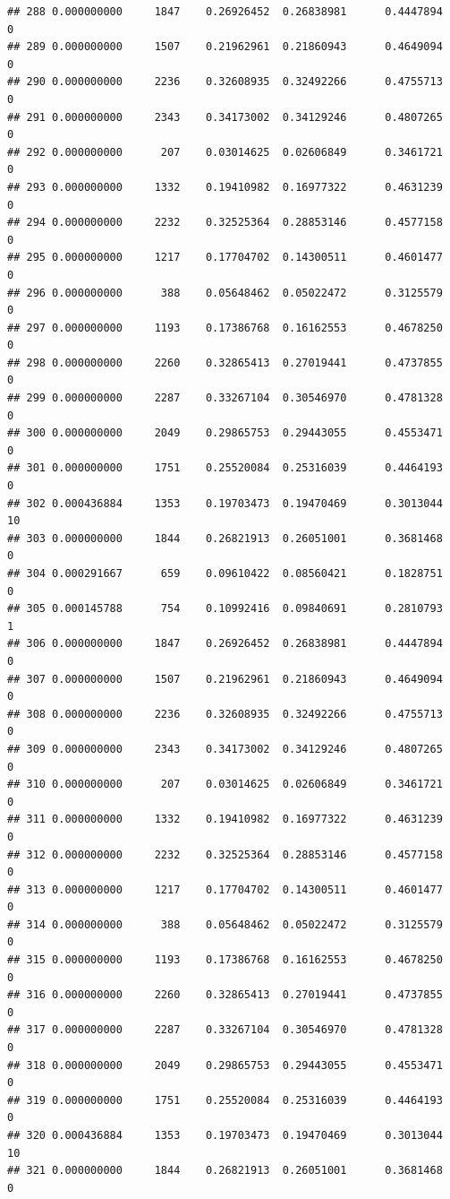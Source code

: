 \documentclass[
]{article}
\begin{document}
\begin{verbatim}
## 288 0.000000000     1847    0.26926452  0.26838981      0.4447894       0
## 289 0.000000000     1507    0.21962961  0.21860943      0.4649094       0
## 290 0.000000000     2236    0.32608935  0.32492266      0.4755713       0
## 291 0.000000000     2343    0.34173002  0.34129246      0.4807265       0
## 292 0.000000000      207    0.03014625  0.02606849      0.3461721       0
## 293 0.000000000     1332    0.19410982  0.16977322      0.4631239       0
## 294 0.000000000     2232    0.32525364  0.28853146      0.4577158       0
## 295 0.000000000     1217    0.17704702  0.14300511      0.4601477       0
## 296 0.000000000      388    0.05648462  0.05022472      0.3125579       0
## 297 0.000000000     1193    0.17386768  0.16162553      0.4678250       0
## 298 0.000000000     2260    0.32865413  0.27019441      0.4737855       0
## 299 0.000000000     2287    0.33267104  0.30546970      0.4781328       0
## 300 0.000000000     2049    0.29865753  0.29443055      0.4553471       0
## 301 0.000000000     1751    0.25520084  0.25316039      0.4464193       0
## 302 0.000436884     1353    0.19703473  0.19470469      0.3013044      10
## 303 0.000000000     1844    0.26821913  0.26051001      0.3681468       0
## 304 0.000291667      659    0.09610422  0.08560421      0.1828751       0
## 305 0.000145788      754    0.10992416  0.09840691      0.2810793       1
## 306 0.000000000     1847    0.26926452  0.26838981      0.4447894       0
## 307 0.000000000     1507    0.21962961  0.21860943      0.4649094       0
## 308 0.000000000     2236    0.32608935  0.32492266      0.4755713       0
## 309 0.000000000     2343    0.34173002  0.34129246      0.4807265       0
## 310 0.000000000      207    0.03014625  0.02606849      0.3461721       0
## 311 0.000000000     1332    0.19410982  0.16977322      0.4631239       0
## 312 0.000000000     2232    0.32525364  0.28853146      0.4577158       0
## 313 0.000000000     1217    0.17704702  0.14300511      0.4601477       0
## 314 0.000000000      388    0.05648462  0.05022472      0.3125579       0
## 315 0.000000000     1193    0.17386768  0.16162553      0.4678250       0
## 316 0.000000000     2260    0.32865413  0.27019441      0.4737855       0
## 317 0.000000000     2287    0.33267104  0.30546970      0.4781328       0
## 318 0.000000000     2049    0.29865753  0.29443055      0.4553471       0
## 319 0.000000000     1751    0.25520084  0.25316039      0.4464193       0
## 320 0.000436884     1353    0.19703473  0.19470469      0.3013044      10
## 321 0.000000000     1844    0.26821913  0.26051001      0.3681468       0

\end{verbatim}
\end{document}
